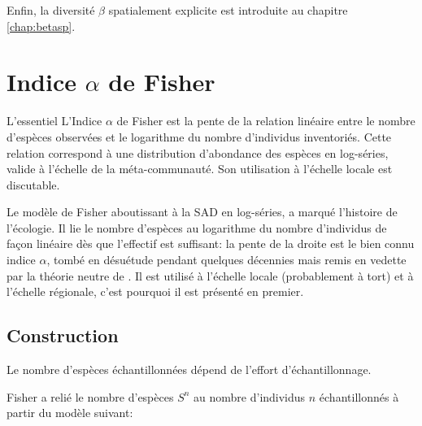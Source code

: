 \documentclass[
  11pt,
  french,
  a4paper,
  extrafontsizes,onecolumn,openright
  ]{memoir}
\newenvironment{Essentiel}
  {\begin{bclogo}[logo=\bctrombone, noborder=true, couleur=lightgray!50]{L'essentiel}\parindent0pt}
  {\end{bclogo}}
\begin{document}
Enfin, la diversité \(\beta\) spatialement explicite est introduite au chapitre \ref{chap:betasp}.

\hypertarget{chap:Fisher}{%
\chapter{\texorpdfstring{Indice \(\alpha\) de Fisher}{Indice \textbackslash alpha de Fisher}}\label{chap:Fisher}}

\scriptsize

\begin{Essentiel}
L'Indice \(\alpha\) de Fisher est la pente de la relation linéaire entre
le nombre d'espèces observées et le logarithme du nombre d'individus
inventoriés. Cette relation correspond à une distribution d'abondance
des espèces en log-séries, valide à l'échelle de la méta-communauté. Son
utilisation à l'échelle locale est discutable.
\end{Essentiel}

\normalsize

Le modèle de Fisher \autocite{Fisher1943} aboutissant à la SAD en log-séries, a marqué l'histoire de l'écologie.
Il lie le nombre d'espèces au logarithme du nombre d'individus de façon linéaire dès que l'effectif est suffisant: la pente de la droite est le bien connu indice \(\alpha\), tombé en désuétude pendant quelques décennies mais remis en vedette par la théorie neutre de \textcite{Hubbell2001}.
Il est utilisé à l'échelle locale (probablement à tort) et à l'échelle régionale, c'est pourquoi il est présenté en premier.

\hypertarget{construction}{%
\section{Construction}\label{construction}}

Le nombre d'espèces échantillonnées dépend de l'effort d'échantillonnage.

Fisher a relié le nombre d'espèces \(S^{n}\) au nombre d'individus \(n\) échantillonnés à partir du modèle suivant:
\end{document}
